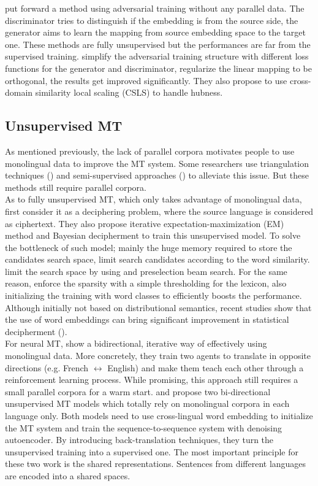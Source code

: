 \cite{zhang2017adversarial} put forward  a method using adversarial training without any parallel data. The discriminator tries to distinguish if the embedding is from the source side, the generator aims to learn the mapping from source embedding space to the target one. These methods are fully unsupervised but the performances are far from the supervised training. \cite{DBLP:journals/corr/abs-1710-04087} simplify the adversarial training structure with different loss functions for the generator and discriminator, regularize the linear mapping to be orthogonal, the results get improved significantly. They also propose to use cross-domain similarity local scaling (CSLS) to handle hubness.

\subsection{Unsupervised MT}

As mentioned previously, the lack of parallel corpora motivates people to use monolingual data to improve the MT system. Some researchers use triangulation techniques (\cite{cohn2007machine}) and semi-supervised approaches (\cite{DBLP:journals/corr/ChengXHHWSL16}) to alleviate this issue. But these methods still require parallel corpora.\\
As to fully unsupervised MT, which only takes advantage of monolingual data, \cite{ravi2011deciphering} first consider it as a deciphering problem, where the source language is considered as ciphertext. They also propose iterative expectation-maximization (EM) method and Bayesian decipherment to train this unsupervised model. To solve the bottleneck of such model; mainly the huge memory required to store the candidates search space, \cite{nuhn2012deciphering} limit search candidates according to the word similarity. \cite{nuhn2014decipherment} limit the search space by using and preselection beam search. For the same reason, \cite{kim2017unsupervised} enforce the sparsity with a simple thresholding for the lexicon, also initializing the training with word classes to efficiently boosts the performance. 
Although initially not based on distributional semantics, recent studies show that the use of word embeddings can bring significant improvement in statistical decipherment (\cite{duong2016learning}).\\
For neural MT, \cite{he2016dual} show a bidirectional, iterative way of effectively using monolingual data. More concretely, they train two agents to translate in opposite directions (e.g. French ${\leftrightarrow}$ English) and make them teach each other through a reinforcement learning process. While promising, this approach still requires a small parallel corpora for a warm start.  
\cite{artetxe2017unsupervised} and \cite{lample2017unsupervised} propose two bi-directional unsupervised MT models which totally rely on monolingual corpora in each language only. Both models need to use cross-lingual word embedding to initialize the MT system and train the sequence-to-sequence system with denoising autoencoder. By introducing back-translation techniques, they turn the unsupervised training into a supervised one. The most important principle for these two work is the shared representations. Sentences from different languages are encoded into a shared spaces.
